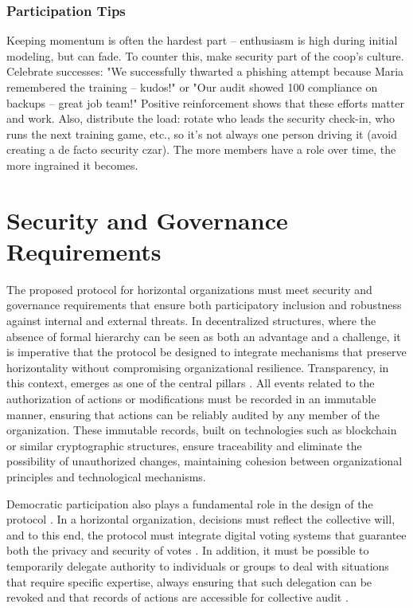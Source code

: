 \subsubsection{Participation Tips}

Keeping momentum is often the hardest part – enthusiasm is high during initial
modeling, but can fade. To counter this, make security part of the coop's
culture. Celebrate successes: "We successfully thwarted a phishing attempt
because Maria remembered the training – kudos!" or "Our audit showed 100%
compliance on backups – great job team!" Positive reinforcement shows that these
efforts matter and work. Also, distribute the load: rotate who leads the
security check-in, who runs the next training game, etc., so it's not always one
person driving it (avoid creating a de facto security czar). The more members
have a role over time, the more ingrained it becomes.

\section{Security and Governance Requirements}
\label{sec:security_governance_requirements}

The proposed protocol for horizontal organizations must meet security and
governance requirements that ensure both participatory inclusion and robustness
against internal and external threats. In decentralized structures, where the
absence of formal hierarchy can be seen as both an advantage and a challenge, it
is imperative that the protocol be designed to integrate mechanisms that
preserve horizontality without compromising organizational resilience.
Transparency, in this context, emerges as one of the central pillars
\cite{Colbac}. All events related to the authorization of actions or
modifications must be recorded in an immutable manner, ensuring that actions can
be reliably audited by any member of the organization. These immutable records,
built on technologies such as blockchain or similar cryptographic structures,
ensure traceability and eliminate the possibility of unauthorized changes,
maintaining cohesion between organizational principles and technological
mechanisms.

Democratic participation also plays a fundamental role in the design of the
protocol \cite{Colbac}. In a horizontal organization, decisions must reflect the
collective will, and to this end, the protocol must integrate digital voting
systems that guarantee both the privacy and security of votes \cite{Colbac}. In
addition, it must be possible to temporarily delegate authority to individuals
or groups to deal with situations that require specific expertise, always
ensuring that such delegation can be revoked and that records of actions are
accessible for collective audit \cite{Colbac}.

